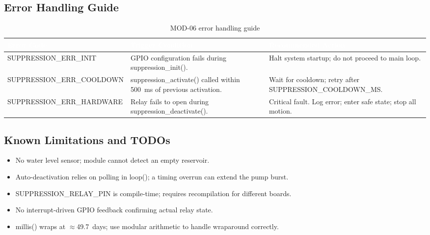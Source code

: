 \documentclass[12pt,a4paper]{article}
\newcommand{\theadtext}[1]{\textcolor{white}{\textbf{#1}}}
\newcommand{\fn}[1]{{\footnotesize\ttfamily #1}}
\begin{document}
\subsection{Error Handling Guide}

\begin{table}[H]
\centering\small
\begin{tabularx}{\textwidth}{L{5.5cm} L{3cm} X}
\toprule
{}
\theadtext{Error Code} & \theadtext{Trigger Condition} & \theadtext{Recommended Action} \\
\midrule
{}   \fn{SUPPRESSION\_ERR\_INIT}     & GPIO configuration fails during \fn{suppression\_init()}. & Halt system startup; do not proceed to main loop. \\
 \fn{SUPPRESSION\_ERR\_COOLDOWN} & \fn{suppression\_activate()} called within 500~ms of previous activation. & Wait for cooldown; retry after \fn{SUPPRESSION\_COOLDOWN\_MS}. \\
   \fn{SUPPRESSION\_ERR\_HARDWARE} & Relay fails to open during \fn{suppression\_deactivate()}. & Critical fault. Log error; enter safe state; stop all motion. \\
\bottomrule
\end{tabularx}
\caption{MOD-06 error handling guide}
\end{table}

\subsection{Known Limitations and TODOs}

\begin{itemize}[leftmargin=1.5em]
  \item No water level sensor; module cannot detect an empty reservoir.
  \item Auto-deactivation relies on polling in \fn{loop()}; a timing overrun can extend the pump burst.
  \item \fn{SUPPRESSION\_RELAY\_PIN} is compile-time; requires recompilation for different boards.
  \item No interrupt-driven GPIO feedback confirming actual relay state.
  \item \fn{millis()} wraps at $\approx$49.7~days; use modular arithmetic to handle wraparound correctly.
\end{itemize}

\newpage

\end{document}
